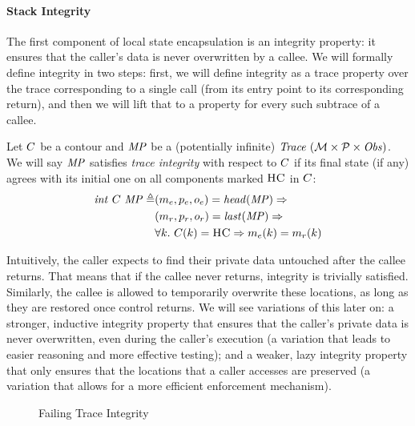 \documentclass[acmsmall,review,anonymous]{acmart}\settopmatter{printfolios=true,printccs=false,printacmref=false}
\begin{document}
\paragraph*{Stack Integrity}

The first component of local state encapsulation is an integrity
property: it ensures that the caller's data is never overwritten by a
callee. We will formally define integrity in two steps: first, we will
define integrity as a trace property over the trace corresponding to a
single call (from its entry point to its corresponding return), and
then we will lift that to a property for every such subtrace of a
callee.


Let $C$ be a contour and $\mathit{MP}$ be a (potentially infinite)
$\mathit{Trace}~({\mathcal M} \times \mathcal{P} \times \mathit{Obs})$. We will say $\mathit{MP}$ satisfies {\em trace integrity} with
respect to $C$ if its final state (if any) agrees with its
initial one on all components marked $\textsc{HC}$ in $C$:
%
\[\begin{split}
  \mathit{int} ~ C ~ \mathit{MP} \triangleq &
    (m_e,p_e,o_e) = \mathit{head}(\mathit{MP}) \Rightarrow \\
  & (m_r,p_r,o_r) = \mathit{last}(\mathit{MP}) \Rightarrow \\
  & \forall k. ~ C(k) = \textsc{HC} \Rightarrow
    m_e(k) = m_r(k) \\
\end{split}\]

Intuitively, the caller expects to find their private data untouched
after the callee returns. That means that if the callee never returns,
integrity is trivially satisfied. Similarly, the callee is allowed to
temporarily overwrite these locations, as long as they are restored
once control returns. We will see variations of this later on: a
stronger, inductive integrity property that ensures that the caller's
private data is never overwritten, even during the caller's execution
(a variation that leads to easier reasoning and more effective testing);
and a weaker, lazy integrity property that only ensures that the
locations that a caller accesses are preserved (a variation that allows
for a more efficient enforcement mechanism).

\begin{figure}
  \integrityexample
  \caption{Failing Trace Integrity}
  \label{fig:intex}
\end{figure}
\end{document}
